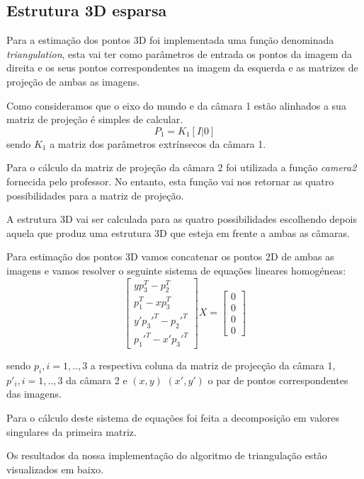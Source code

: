 \documentclass[journal]{IEEEtran}
\begin{document}
\subsection*{Estrutura 3D esparsa}
\par Para a estimação dos pontos 3D foi implementada uma função denominada \textit{triangulation}, esta vai ter como parâmetros de entrada os pontos da imagem da direita e os seus pontos correspondentes na imagem da esquerda e as matrizes de projeção de ambas as imagens.
\par Como consideramos que o eixo do mundo e da câmara 1 estão alinhados a sua matriz de projeção é simples de calcular.
\begin{equation}
    P_1 = K_1[I | 0]
\end{equation}
sendo $K_1$ a matriz dos parâmetros extrínsecos da câmara 1.
\par Para o cálculo da matriz de projeção da câmara 2 foi utilizada a função \textit{camera2} fornecida pelo professor. No entanto, esta função vai nos retornar as quatro possibilidades para a matriz de projeção.
\par A estrutura 3D vai ser calculada para as quatro possibilidades escolhendo depois aquela que produz uma estrutura 3D que esteja em frente a ambas as câmaras.
\par Para estimação dos pontos 3D vamos concatenar os pontos 2D de ambas as imagens e vamos resolver o seguinte sistema de equações lineares homogéneas:
\begin{equation}
    \begin{bmatrix}
    yp_3^T - p_2^T \\
    p_1^T - xp_3^T \\
    y'p_3'^T - p_2'^T \\
    p_1'^T - x'p_3'^T
    \end{bmatrix}
    X = 
    \begin{bmatrix}
    0 \\ 0 \\ 0 \\ 0
    \end{bmatrix}
\end{equation}
\par sendo $p_i, i=1,..,3$ a respectiva coluna da matriz de projecção da câmara 1, $p'_i, i=1,..,3$ da câmara 2 e $(x,y)$ $(x',y')$ o par de pontos correspondentes das imagens.
\par Para o cálculo deste sistema de equações foi feita a decomposição em valores singulares da primeira matriz.
\par Os resultados da nossa implementação do algoritmo de triangulação estão visualizados em baixo.
\end{document}
